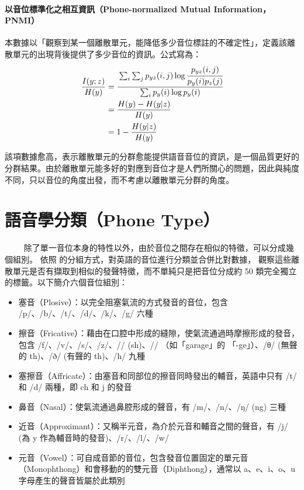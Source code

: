 \paragraph{以音位標準化之相互資訊（Phone-normalized Mutual Information，PNMI）}

本數據以「觀察到某一個離散單元，能降低多少音位標註的不確定性」，定義該離散單元的出現背後提供了多少音位的資訊。公式寫為：
\begin{align}
    \frac{I(y;z)}{H(y)} & =\cfrac{\sum_i \sum_j p_{yz}(i, j) \log \cfrac{p_{yz}(i, j)}{p_y(i)p_z(j)}}{\sum_i p_y(i) \log p_y(i)} \\
                        & =\frac{H(y)-H(y|z)}{H(y)}                                                                              \\
                        & =1-\frac{H(y|z)}{H(y)}
\end{align}

該項數據愈高，表示離散單元的分群愈能提供語音音位的資訊，是一個品質更好的分群結果。由於離散單元能多好的對應到音位才是人們所關心的問題，因此與純度不同，只以音位的角度出發，而不考慮以離散單元分群的角度。

% 

\section{語音學分類（Phone Type）}

　　
除了單一音位本身的特性以外，由於音位之間存在相似的特徵，可以分成幾個組別。
依照 \cite{10097097, abdullah23_interspeech} 的分組方式，對英語的音位進行分類並合併比對數據，
觀察這些離散單元是否有擷取到相似的發聲特徵，而不單純只是把音位分成約 50 類完全獨立的標籤。以下簡介六個音位組別：



\begin{itemize}
    \item 塞音（Plosive）：以完全阻塞氣流的方式發音的音位，包含 /p/、/b/、/t/、/d/、/k/、/g/ 六種
    \item 擦音（Fricative）：藉由在口腔中形成的縫隙，使氣流通過時摩擦形成的發音，包含 /f/、/v/、/s/、/z/、/\textesh/ (sh)、/\textyogh/ （如「garage」的 「-ge」）、/θ/ (無聲的 th)、/ð/ (有聲的 th)、/h/ 九種
    \item 塞擦音（Affricate）：由塞音和同部位的擦音同時發出的輔音，英語中只有 /t\textesh/ 和 /d\textyogh/ 兩種，即 ch 和 j 的發音
    \item 鼻音（Nasal）：使氣流通過鼻腔形成的聲音，有 /m/、/n/、/ŋ/ (ng) 三種
    \item 近音（Approximant）：又稱半元音，為介於元音和輔音之間的聲音，有 /j/ (為 y 作為輔音時的發音)、/r/、/l/、/w/
    \item 元音（Vowel）：可自成音節的音位，包含發音位置固定的單元音（Monophthong）和會移動的的雙元音（Diphthong），通常以 a、e、i、o、u 字母產生的聲音皆屬於此類別
\end{itemize}


